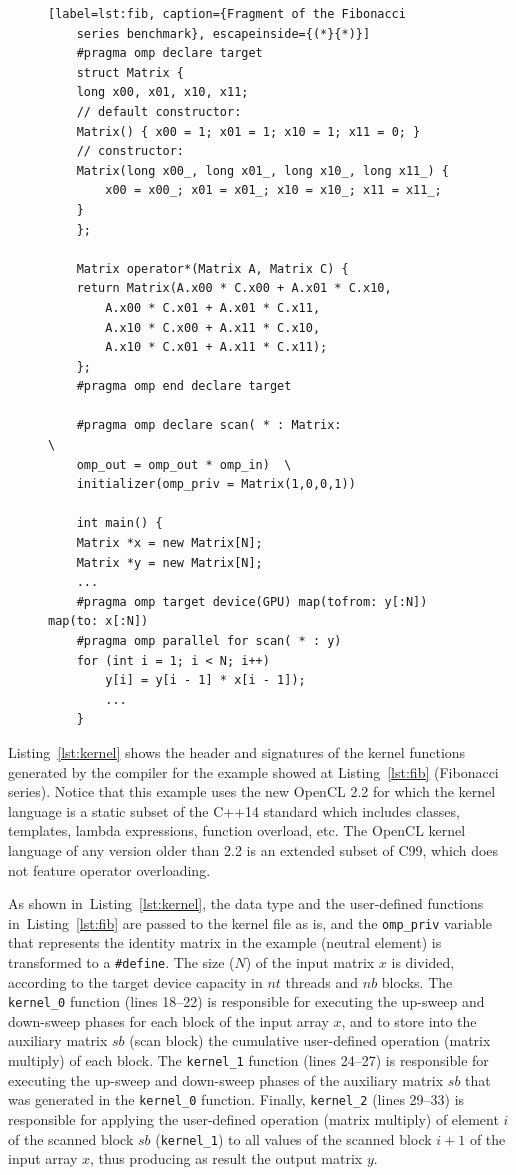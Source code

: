 \documentclass[Ingles]{ic-tese-v1}
\newcommand{\ttt}[1]{{\texttt{#1}}}
\newcommand{\rlst}[1]{Listing~\ref{lst:#1}}
\begin{document}
\begin{figure}[t]
	\lstset{basicstyle=\scriptsize}
	\begin{lstlisting}[label=lst:fib, caption={Fragment of the Fibonacci
	series benchmark}, escapeinside={(*}{*)}]
	#pragma omp declare target
	struct Matrix {
	long x00, x01, x10, x11;
	// default constructor:
	Matrix() { x00 = 1; x01 = 1; x10 = 1; x11 = 0; }
	// constructor:
	Matrix(long x00_, long x01_, long x10_, long x11_) {
		x00 = x00_; x01 = x01_; x10 = x10_; x11 = x11_;
	}
	};

	Matrix operator*(Matrix A, Matrix C) {
	return Matrix(A.x00 * C.x00 + A.x01 * C.x10,
		A.x00 * C.x01 + A.x01 * C.x11,
		A.x10 * C.x00 + A.x11 * C.x10,
		A.x10 * C.x01 + A.x11 * C.x11);
	};
	#pragma omp end declare target

	#pragma omp declare scan( * : Matrix:                     \ 
	omp_out = omp_out * omp_in)  \
	initializer(omp_priv = Matrix(1,0,0,1))

	int main() {
	Matrix *x = new Matrix[N];
	Matrix *y = new Matrix[N];
	...
	#pragma omp target device(GPU) map(tofrom: y[:N]) map(to: x[:N])
	#pragma omp parallel for scan( * : y)
	for (int i = 1; i < N; i++)
		y[i] = y[i - 1] * x[i - 1]);
		...
	}
	\end{lstlisting}
\end{figure}

\rlst{kernel} shows the header and signatures of the kernel
functions  generated  by  the  compiler  for  the  example  showed  at
\rlst{fib} (Fibonacci  series). Notice that this
example uses the new OpenCL 2.2 for which  the kernel language is a
static subset of the C++14 standard  which includes classes, templates,
lambda  expressions,  function  overload, etc.  The  OpenCL  kernel
language of any version older than  2.2 is an extended subset of
C99,  which does not feature  operator overloading.

As  shown in~\rlst{kernel},  the  data  type  and  the
user-defined functions  in~\rlst{fib} are passed to  the kernel file
as is, and the \ttt{omp\_priv} variable that represents the identity
matrix  in  the   example  (neutral  element)  is   transformed  to  a
\ttt{\#define}.  The size ($N$) of  the input matrix $x$ is divided,
according to the target device  capacity in $nt$ threads and $nb$
blocks.  The \ttt{kernel\_0} function  (lines 18--22) is responsible
for executing the  up-sweep and down-sweep phases for  each block of
the input array $x$, and to store into the auxiliary matrix $sb$ (scan
block) the  cumulative user-defined  operation (matrix  multiply) of
each  block.    The  \ttt{kernel\_1}  function  (lines   24--27)  is
responsible for executing the up-sweep  and down-sweep phases of the
auxiliary matrix  $sb$  that was generated  in  the  \ttt{kernel\_0}
function.   Finally, \ttt{kernel\_2}  (lines 29--33)  is responsible
for applying the user-defined operation (matrix multiply) of element
$i$ of  the scanned block  $sb$ (\ttt{kernel\_1}) to  all values  of the
scanned block $i+1$  of the input array $x$, thus  producing  as result the
output matrix $y$.
\end{document}
